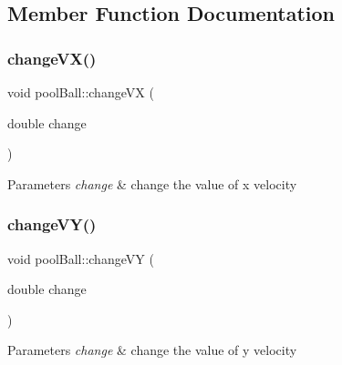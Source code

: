 \subsection{Member Function Documentation}
\mbox{\label{classpool_ball_ab98b836bfc2de5d1573a6f015614da75}} 
\subsubsection{\texorpdfstring{change\+V\+X()}{changeVX()}}
{\footnotesize\ttfamily void pool\+Ball\+::change\+VX (\begin{DoxyParamCaption}\item[{double}]{change }\end{DoxyParamCaption})\hspace{0.3cm}{\ttfamily [inline]}}


\begin{DoxyParams}{Parameters}
{\em change} & change the value of x velocity \\
\hline
\end{DoxyParams}
\mbox{\label{classpool_ball_af0816c210e83ac30c1cedde19fd92c4a}} 
\subsubsection{\texorpdfstring{change\+V\+Y()}{changeVY()}}
{\footnotesize\ttfamily void pool\+Ball\+::change\+VY (\begin{DoxyParamCaption}\item[{double}]{change }\end{DoxyParamCaption})\hspace{0.3cm}{\ttfamily [inline]}}


\begin{DoxyParams}{Parameters}
{\em change} & change the value of y velocity \\
\hline
\end{DoxyParams}
\mbox{\label{classpool_ball_a62f83890e97cd5b40f97103e835e38da}} 
